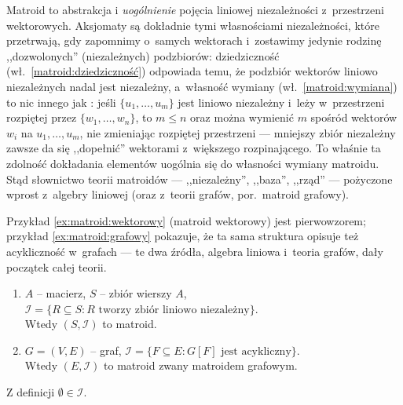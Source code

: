 \begin{dygresja}
	Matroid to abstrakcja i \emph{uogólnienie} pojęcia liniowej niezależności z~przestrzeni wektorowych. Aksjomaty są dokładnie tymi własnościami niezależności, które przetrwają, gdy zapomnimy o~samych wektorach i~zostawimy jedynie rodzinę ,,dozwolonych'' (niezależnych) podzbiorów: dziedziczność (wł.\ \ref{matroid:dziedziczność}) odpowiada temu, że podzbiór wektorów liniowo niezależnych nadal jest niezależny, a~własność wymiany (wł.\ \ref{matroid:wymiana}) to nic innego jak : jeśli $\{u_1, \dots, u_m\}$ jest liniowo niezależny i~leży w~przestrzeni rozpiętej przez $\{w_1, \dots, w_n\}$, to $m \leq n$ oraz można wymienić $m$ spośród wektorów $w_i$ na $u_1, \dots, u_m$, nie zmieniając rozpiętej przestrzeni --- mniejszy zbiór niezależny zawsze da się ,,dopełnić'' wektorami z~większego rozpinającego. To właśnie ta zdolność dokładania elementów uogólnia się do własności wymiany matroidu. Stąd słownictwo teorii matroidów --- ,,niezależny'', ,,baza'', ,,rząd'' --- pożyczone wprost z~algebry liniowej (oraz z~teorii grafów, por.\ matroid grafowy).

	Przykład \ref{ex:matroid:wektorowy} (matroid wektorowy) jest pierwowzorem; przykład \ref{ex:matroid:grafowy} pokazuje, że ta sama struktura opisuje też acykliczność w~grafach --- te dwa źródła, algebra liniowa i~teoria grafów, dały początek całej teorii.
\end{dygresja}

\begin{example} \label{ex:matroid-podstawowe} \leavevmode
	\begin{enumerate}[ref=\thedefinition.\arabic*]
		\item \label{ex:matroid:wektorowy} $A$ -- macierz, $S$ -- zbiór wierszy $A$, $\mathcal{I} = \{R \subseteq S : R \text{ tworzy zbiór liniowo niezależny}\}$.\\
		      Wtedy $(S, \mathcal{I})$ to matroid.
		\item \label{ex:matroid:grafowy} $G = (V, E)$ -- graf, $\mathcal{I} = \{F \subseteq E : G[F] \text{ jest acykliczny}\}$.\\
		      Wtedy $(E, \mathcal{I})$ to matroid zwany matroidem grafowym.
	\end{enumerate}
	Z definicji $\emptyset \in \mathcal{I}$.
\end{example}

